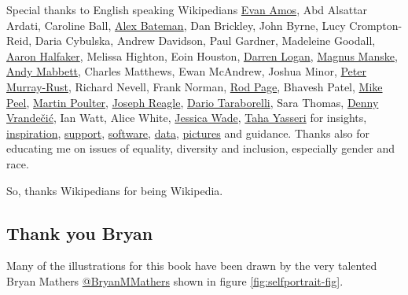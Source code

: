 \documentclass[
]{book}
\begin{document}
Special thanks to English speaking Wikipedians \href{https://en.wikipedia.org/wiki/Evan_Amos}{Evan Amos}, Abd Alsattar Ardati, Caroline Ball, \href{https://en.wikipedia.org/wiki/Alex_Bateman}{Alex Bateman}, Dan Brickley, John Byrne, Lucy Crompton-Reid, Daria Cybulska, Andrew Davidson, Paul Gardner, Madeleine Goodall, \href{https://en.wikipedia.org/wiki/Aaron_Halfaker}{Aaron Halfaker}, Melissa Highton, Eoin Houston, \href{https://royalsociety.org/topics-policy/projects/research-culture/changing-expectations/dr-darren-logan/}{Darren Logan}, \href{https://en.wikipedia.org/wiki/Magnus_Manske}{Magnus Manske}, \href{https://commons.wikimedia.org/wiki/User:Pigsonthewing}{Andy Mabbett}, Charles Matthews, Ewan McAndrew, Joshua Minor, \href{https://en.wikipedia.org/wiki/Peter_Murray-Rust}{Peter Murray-Rust}, Richard Nevell, Frank Norman, \href{https://en.wikipedia.org/wiki/Roderic_D._M._Page}{Rod Page}, Bhavesh Patel, \href{https://www.mikepeel.net/}{Mike Peel}, \href{http://infobomb.org/}{Martin Poulter}, \href{https://en.wikipedia.org/wiki/Joseph_M._Reagle_Jr.}{Joseph Reagle}, \href{https://nitens.org/w/}{Dario Taraborelli}, Sara Thomas, \href{https://en.wikipedia.org/wiki/Denny_Vrande\%C4\%8Di\%C4\%87}{Denny Vrandečić}, Ian Watt, Alice White, \href{https://en.wikipedia.org/wiki/Jess_Wade}{Jessica Wade}, \href{https://en.wikipedia.org/wiki/Taha_Yasseri}{Taha Yasseri} for insights, \href{https://duncan.hull.name/2019/12/10/glasgow/}{inspiration}, \href{https://wiki-loves-scientists.org.uk/2020/05/21/wiki1000/}{support}, \href{https://apps.apple.com/us/app/wikipedia/id324715238}{software}, \href{https://www.wikidata.org/}{data}, \href{https://commons.wikimedia.org/}{pictures} and guidance. Thanks also for educating me on issues of equality, diversity and inclusion, especially gender and race.

So, thanks Wikipedians for being Wikipedia. 🙏

\hypertarget{visualthinkery}{%
\subsection{Thank you Bryan}\label{visualthinkery}}

Many of the illustrations for this book have been drawn by the very talented Bryan Mathers \href{https://twitter.com/BryanMMathers/}{@BryanMMathers} shown in figure \ref{fig:selfportrait-fig}.
\end{document}
